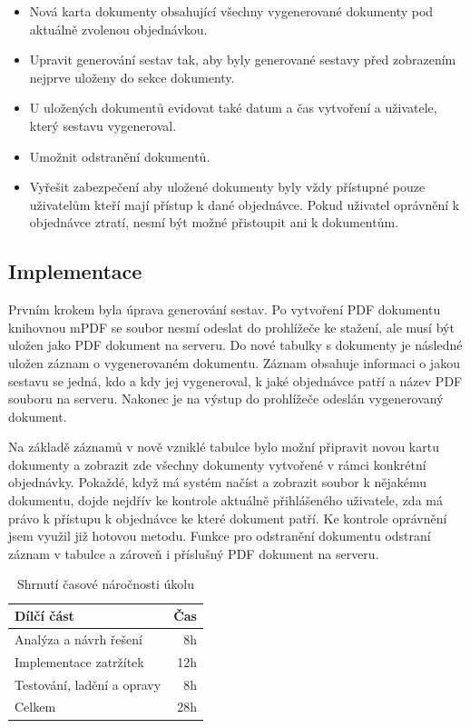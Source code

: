 \begin{itemize}
    \item Nová karta dokumenty obsahující všechny vygenerované dokumenty pod aktuálně zvolenou objednávkou.
    \item Upravit generování sestav tak, aby byly generované sestavy před zobrazením nejprve uloženy do sekce dokumenty.
    \item U uložených dokumentů evidovat také datum a čas vytvoření a uživatele, který sestavu vygeneroval.
    \item Umožnit odstranění dokumentů.
    \item Vyřešit zabezpečení aby uložené dokumenty byly vždy přístupné pouze uživatelům kteří mají přístup k dané objednávce. Pokud uživatel oprávnění k objednávce ztratí, nesmí být možné přistoupit ani k dokumentům.
\end{itemize}

\subsection{Implementace}

Prvním krokem byla úprava generování sestav. Po vytvoření PDF dokumentu knihovnou mPDF se soubor nesmí odeslat do prohlížeče ke stažení, ale musí být uložen jako PDF dokument 
na serveru. Do nové tabulky s dokumenty je následné uložen záznam o vygenerovaném dokumentu. Záznam obsahuje informaci o jakou sestavu se jedná, kdo a kdy jej vygeneroval, k jaké objednávce patří a název PDF souboru na serveru. Nakonec je na výstup do prohlížeče odeslán vygenerovaný dokument.

Na základě záznamů v nově vzniklé tabulce bylo možní připravit novou kartu dokumenty a zobrazit zde všechny dokumenty vytvořené v rámci konkrétní objednávky. Pokaždé, když má systém načíst a zobrazit soubor k nějakému dokumentu, dojde nejdřív ke kontrole aktuálně přihlášeného uživatele, zda má právo k přístupu k objednávce ke které dokument patří. Ke kontrole oprávnění jsem využil již hotovou metodu. Funkce pro odstranění dokumentu odstraní záznam v tabulce a zároveň i příslušný PDF dokument na serveru. 


\begin{table}
	\centering
	\caption[Časová náročnost úkolu na dokumenty]{Shrnutí časové náročnosti úkolu}
	\label{tab:TopLevelTableLabel}
	{
		\begin{tabular}{lr}
			\toprule
			Dílčí část & Čas\\
			\midrule
			Analýza a návrh řešení & 8h \\
			Implementace zatržítek & 12h \\
            Testování, ladění a opravy & 8h \\
            \midrule
            Celkem  & 28h \\
			\midrule
		\end{tabular}
	}
\end{table}


